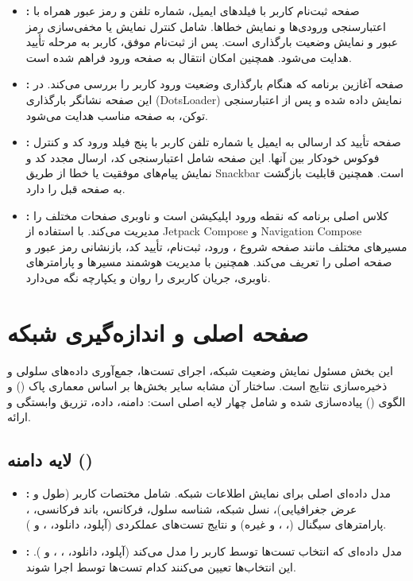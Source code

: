 \begin{itemize}
	\item \textbf{:}  
	صفحه ثبت‌نام کاربر با فیلدهای ایمیل، شماره تلفن و رمز عبور همراه با اعتبارسنجی ورودی‌ها و نمایش خطاها. شامل کنترل نمایش یا مخفی‌سازی رمز عبور و نمایش وضعیت بارگذاری است. پس از ثبت‌نام موفق، کاربر به مرحله تأیید هدایت می‌شود. همچنین امکان انتقال به صفحه ورود فراهم شده است.
	
	\item \textbf{:}  
	صفحه آغازین برنامه که هنگام بارگذاری وضعیت ورود کاربر را بررسی می‌کند. در این صفحه نشانگر بارگذاری (DotsLoader) نمایش داده شده و پس از اعتبارسنجی توکن، به صفحه مناسب هدایت می‌شود.
	
	\item \textbf{:}  
	صفحه تأیید کد ارسالی به ایمیل یا شماره تلفن کاربر با پنج فیلد ورود کد و کنترل فوکوس خودکار بین آنها. این صفحه شامل اعتبارسنجی کد، ارسال مجدد کد و نمایش پیام‌های موفقیت یا خطا از طریق Snackbar است. همچنین قابلیت بازگشت به صفحه قبل را دارد.
	
	\item \textbf{:}  
	کلاس اصلی برنامه که نقطه ورود اپلیکیشن است و ناوبری صفحات مختلف را مدیریت می‌کند. با استفاده از Jetpack Compose و Navigation Compose مسیرهای مختلف مانند صفحه شروع ، ورود، ثبت‌نام، تأیید کد، بازنشانی رمز عبور و صفحه اصلی را تعریف می‌کند. همچنین با مدیریت هوشمند مسیرها و پارامترهای ناوبری، جریان کاربری را روان و یکپارچه نگه می‌دارد.
	
\end{itemize}

\section{صفحه اصلی و اندازه‌گیری شبکه}
این بخش مسئول نمایش وضعیت شبکه، اجرای تست‌ها، جمع‌آوری داده‌های سلولی و ذخیره‌سازی نتایج است. ساختار آن مشابه سایر بخش‌ها بر اساس معماری پاک () و الگوی () پیاده‌سازی شده و شامل چهار لایه اصلی است: دامنه، داده، تزریق وابستگی و ارائه.

\subsection{لایه دامنه ()}
\begin{itemize}
    \item \textbf{:}  
    مدل داده‌ای اصلی برای نمایش اطلاعات شبکه. شامل مختصات کاربر (طول و عرض جغرافیایی)، نسل شبکه، شناسه سلول، فرکانس، باند فرکانسی، ، پارامترهای سیگنال (، ،  و غیره)
    و نتایج تست‌های عملکردی (آپلود، دانلود، ،  و ).
    
    \item \textbf{:}  
    مدل داده‌ای که انتخاب تست‌ها توسط کاربر را مدل می‌کند (آپلود، دانلود، ، ،  و ). این انتخاب‌ها تعیین می‌کنند کدام تست‌ها توسط  اجرا شوند.
\end{itemize}


